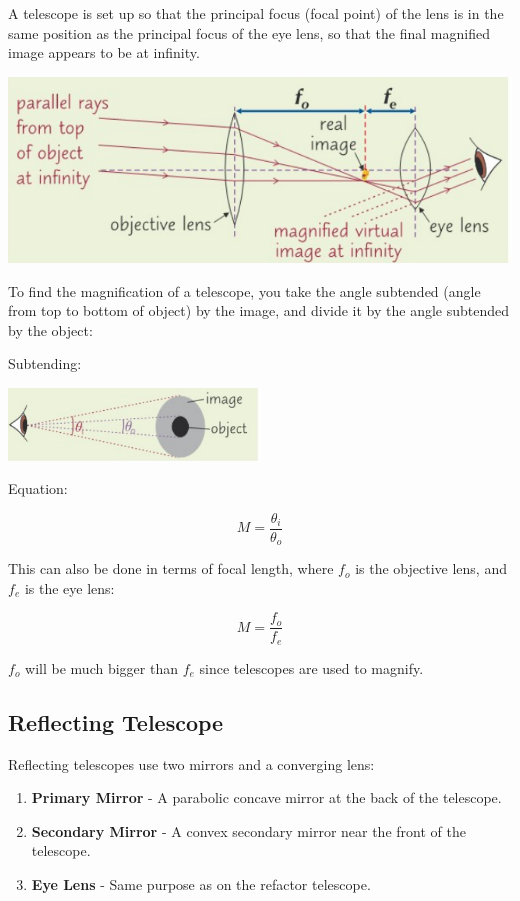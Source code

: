 \documentclass[a4paper, 12pt]{article}
\begin{document}
A telescope is set up so that the principal focus (focal point) of the lens is in the same position as the principal focus of the eye lens, so that the final magnified image appears to be at infinity.

\includegraphics[width=\textwidth]{images/refactingTeleLayout.png}

To find the magnification of a telescope, you take the angle subtended (angle from top to bottom of object) by the image, and divide it by the angle subtended by the object:

Subtending:

\begin{center}
\includegraphics[width=0.5\textwidth]{images/subtend.png}
\end{center}

Equation:

$$
M = \frac{\theta_i}{\theta_o}
$$

This can also be done in terms of focal length, where $f_o$ is the objective lens, and $f_e$ is the eye lens:

$$
M = \frac{f_o}{f_e}
$$

$f_o$ will be much bigger than $f_e$ since telescopes are used to magnify.

\subsection{Reflecting Telescope}

Reflecting telescopes use two mirrors and a converging lens:

\begin{enumerate}
	\item \textbf{Primary Mirror} - A parabolic concave mirror at the back of the telescope.
	\item \textbf{Secondary Mirror} - A convex secondary mirror near the front of the telescope.
	\item \textbf{Eye Lens} - Same purpose as on the refactor telescope.
\end{enumerate}
\end{document}
